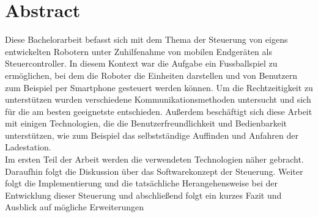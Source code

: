 \chapter*{Abstract}
Diese Bachelorarbeit befasst sich mit dem Thema der Steuerung von eigens entwickelten Robotern unter Zuhilfenahme von mobilen Endgeräten als Steuercontroller. In diesem Kontext war die Aufgabe ein Fussballspiel zu ermöglichen, bei dem die Roboter die Einheiten darstellen und von Benutzern zum Beispiel per Smartphone gesteuert werden können. Um die Rechtzeitigkeit zu unterstützen wurden verschiedene Kommunikationsmethoden untersucht und sich für die am besten geeignetste entschieden. Außerdem beschäftigt sich diese Arbeit mit einigen Technologien, die die Benutzerfreundlichkeit und Bedienbarkeit unterstützen, wie zum Beispiel das selbstständige Auffinden und Anfahren der Ladestation. \\
Im ersten Teil der Arbeit werden die verwendeten Technologien näher gebracht. Daraufhin folgt die Diskussion über das Softwarekonzept der Steuerung. Weiter folgt die Implementierung und die tatsächliche Herangehensweise bei der Entwicklung dieser Steuerung und abschließend folgt ein kurzes Fazit und Ausblick auf mögliche Erweiterungen
